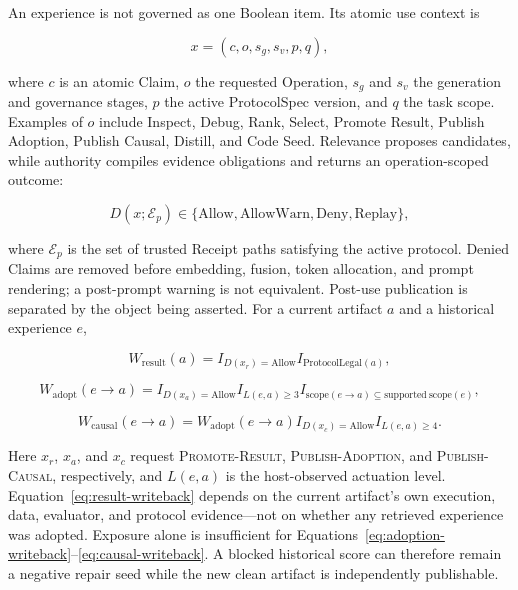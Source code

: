 \documentclass{article}
\begin{document}
An experience is not governed as one Boolean item.  Its atomic use context is

\begin{equation}
x=(c,o,s_g,s_v,p,q),
\label{eq:claim-use}
\end{equation}

where $c$ is an atomic Claim, $o$ the requested Operation, $s_g$ and $s_v$ the
generation and governance stages, $p$ the active ProtocolSpec version, and $q$
the task scope.  Examples of $o$ include Inspect, Debug, Rank, Select,
Promote Result, Publish Adoption, Publish Causal, Distill, and Code Seed.
Relevance proposes candidates, while authority compiles
evidence obligations and returns an operation-scoped outcome:

\begin{equation}
  D(x;\mathcal{E}_p)\in
  \{\mathrm{Allow},\mathrm{AllowWarn},\mathrm{Deny},\mathrm{Replay}\},
  \label{eq:admissibility}
\end{equation}

where $\mathcal{E}_p$ is the set of trusted Receipt paths satisfying the active
protocol.  Denied Claims are removed before embedding, fusion, token allocation,
and prompt rendering; a post-prompt warning is not equivalent.  Post-use
publication is separated by the object being asserted.  For a current artifact
$a$ and a historical experience $e$,

\begin{equation}
W_{\mathrm{result}}(a)=
I_{D(x_r)=\mathrm{Allow}}I_{\mathrm{ProtocolLegal}(a)},
\label{eq:result-writeback}
\end{equation}

\begin{equation}
W_{\mathrm{adopt}}(e\!\rightarrow\!a)=
I_{D(x_a)=\mathrm{Allow}}I_{L(e,a)\geq 3}
I_{\mathrm{scope}(e\!\rightarrow\!a)\subseteq
\mathrm{supported\ scope}(e)},
\label{eq:adoption-writeback}
\end{equation}

\begin{equation}
W_{\mathrm{causal}}(e\!\rightarrow\!a)=
W_{\mathrm{adopt}}(e\!\rightarrow\!a)
I_{D(x_c)=\mathrm{Allow}}I_{L(e,a)\geq 4}.
\label{eq:causal-writeback}
\end{equation}

Here $x_r$, $x_a$, and $x_c$ request \textsc{Promote-Result},
\textsc{Publish-Adoption}, and \textsc{Publish-Causal}, respectively, and
$L(e,a)$ is the host-observed actuation level.  Equation~\ref{eq:result-writeback}
depends on the current artifact's own execution, data, evaluator, and protocol
evidence---not on whether any retrieved experience was adopted.  Exposure alone
is insufficient for Equations~\ref{eq:adoption-writeback}--\ref{eq:causal-writeback}.
A blocked historical score can therefore remain a negative repair seed while
the new clean artifact is independently publishable.
\end{document}
